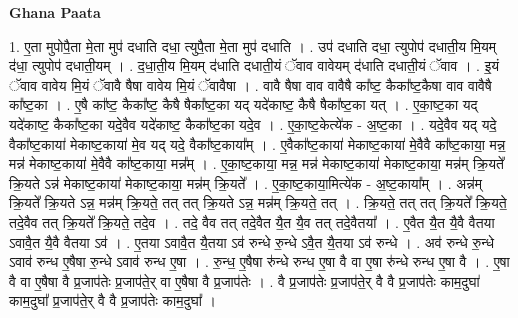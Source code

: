 \documentclass[17pt]{extarticle}
\begin{document}
\textbf{Ghana Paata } \newline

1. ए॒ता मुपोपै॒ता मे॒ता मुप॑ दधाति दधा॒ त्युपै॒ता मे॒ता मुप॑ दधाति । . उप॑ दधाति दधा॒ त्युपोप॑ दधाती॒य मि॒यम् द॑धा॒ त्युपोप॑ दधाती॒यम् । . द॒धा॒ती॒य मि॒यम् द॑धाति दधाती॒यं ॅवाव वावेयम् द॑धाति दधाती॒यं ॅवाव । . इ॒यं ॅवाव वावेय मि॒यं ॅवावै षैषा वावेय मि॒यं ॅवावैषा । . वावै षैषा वाव वावैषै का᳚ष्ट॒ कैका᳚ष्ट॒कैषा वाव वावैषै का᳚ष्ट॒का । . ए॒षै का᳚ष्ट॒ कैका᳚ष्ट॒ कैषै षैका᳚ष्ट॒का यद् यदे॑काष्ट॒ कैषै षैका᳚ष्ट॒का यत् । . ए॒का॒ष्ट॒का यद् यदे॑काष्ट॒ कैका᳚ष्ट॒का यदे॒वैव यदे॑काष्ट॒ कैका᳚ष्ट॒का यदे॒व । . ए॒का॒ष्ट॒केत्ये॑क - अ॒ष्ट॒का । . यदे॒वैव यद् यदे॒ वैका᳚ष्ट॒काया॑ मेकाष्ट॒काया॑ मे॒व यद् यदे॒ वैका᳚ष्ट॒काया᳚म् । . ए॒वैका᳚ष्ट॒काया॑ मेकाष्ट॒काया॑ मे॒वैवै का᳚ष्ट॒काया॒ मन्न॒ मन्न॑ मेकाष्ट॒काया॑ मे॒वैवै का᳚ष्ट॒काया॒ मन्न᳚म् । . ए॒का॒ष्ट॒काया॒ मन्न॒ मन्न॑ मेकाष्ट॒काया॑ मेकाष्ट॒काया॒ मन्न॑म् क्रि॒यते᳚ क्रि॒यते ऽन्न॑ मेकाष्ट॒काया॑ मेकाष्ट॒काया॒ मन्न॑म् क्रि॒यते᳚ । . ए॒का॒ष्ट॒काया॒मित्ये॑क - अ॒ष्ट॒काया᳚म् । . अन्न॑म् क्रि॒यते᳚ क्रि॒यते ऽन्न॒ मन्न॑म् क्रि॒यते॒ तत् तत् क्रि॒यते ऽन्न॒ मन्न॑म् क्रि॒यते॒ तत् । . क्रि॒यते॒ तत् तत् क्रि॒यते᳚ क्रि॒यते॒ तदे॒वैव तत् क्रि॒यते᳚ क्रि॒यते॒ तदे॒व । . तदे॒ वैव तत् तदे॒वैत यै॒त यै॒व तत् तदे॒वैतया᳚ । . ए॒वैत यै॒त यै॒वै वैतया ऽवावै॒त यै॒वै वैतया ऽव॑ । . ए॒तया ऽवावै॒त यै॒तया ऽव॑ रुन्धे रु॒न्धे ऽवै॒त यै॒तया ऽव॑ रुन्धे । . अव॑ रुन्धे रु॒न्धे ऽवाव॑ रुन्ध ए॒षैषा रु॒न्धे ऽवाव॑ रुन्ध ए॒षा । . रु॒न्ध॒ ए॒षैषा रु॑न्धे रुन्ध ए॒षा वै वा ए॒षा रु॑न्धे रुन्ध ए॒षा वै । . ए॒षा वै वा ए॒षैषा वै प्र॒जाप॑तेः प्र॒जाप॑ते॒र् वा ए॒षैषा वै प्र॒जाप॑तेः । . वै प्र॒जाप॑तेः प्र॒जाप॑ते॒र् वै वै प्र॒जाप॑तेः काम॒दुघा॑ काम॒दुघा᳚ प्र॒जाप॑ते॒र् वै वै प्र॒जाप॑तेः काम॒दुघा᳚ । \newline
\end{document}

